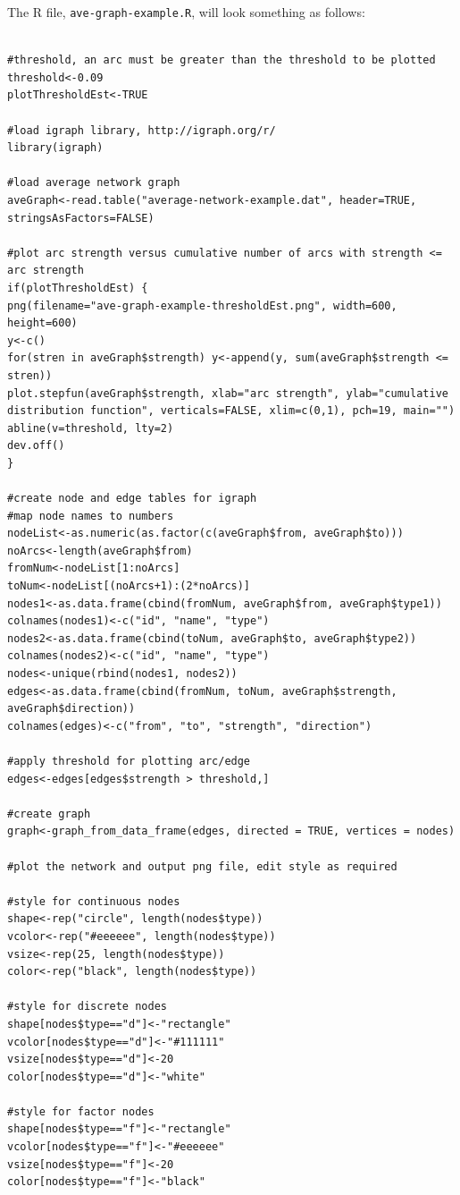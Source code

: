 \documentclass[a4paper,12pt]{article}
\newcommand{\code}[1]{{\footnotesize{{\tt #1}}}}
\begin{document}
The R file, \code{ave-graph-example.R}, will look something as follows: 
\vspace{0.35cm} \begin{lstlisting}

#threshold, an arc must be greater than the threshold to be plotted
threshold<-0.09
plotThresholdEst<-TRUE

#load igraph library, http://igraph.org/r/
library(igraph)

#load average network graph
aveGraph<-read.table("average-network-example.dat", header=TRUE, stringsAsFactors=FALSE)

#plot arc strength versus cumulative number of arcs with strength <= arc strength
if(plotThresholdEst) {
png(filename="ave-graph-example-thresholdEst.png", width=600, height=600)
y<-c()
for(stren in aveGraph$strength) y<-append(y, sum(aveGraph$strength <= stren))
plot.stepfun(aveGraph$strength, xlab="arc strength", ylab="cumulative distribution function", verticals=FALSE, xlim=c(0,1), pch=19, main="")
abline(v=threshold, lty=2)
dev.off()
}

#create node and edge tables for igraph
#map node names to numbers
nodeList<-as.numeric(as.factor(c(aveGraph$from, aveGraph$to)))
noArcs<-length(aveGraph$from)
fromNum<-nodeList[1:noArcs]
toNum<-nodeList[(noArcs+1):(2*noArcs)]
nodes1<-as.data.frame(cbind(fromNum, aveGraph$from, aveGraph$type1))
colnames(nodes1)<-c("id", "name", "type")
nodes2<-as.data.frame(cbind(toNum, aveGraph$to, aveGraph$type2))
colnames(nodes2)<-c("id", "name", "type")
nodes<-unique(rbind(nodes1, nodes2))
edges<-as.data.frame(cbind(fromNum, toNum, aveGraph$strength, aveGraph$direction))
colnames(edges)<-c("from", "to", "strength", "direction")

#apply threshold for plotting arc/edge
edges<-edges[edges$strength > threshold,]

#create graph
graph<-graph_from_data_frame(edges, directed = TRUE, vertices = nodes)

#plot the network and output png file, edit style as required

#style for continuous nodes
shape<-rep("circle", length(nodes$type))
vcolor<-rep("#eeeeee", length(nodes$type))
vsize<-rep(25, length(nodes$type))
color<-rep("black", length(nodes$type))

#style for discrete nodes
shape[nodes$type=="d"]<-"rectangle"
vcolor[nodes$type=="d"]<-"#111111"
vsize[nodes$type=="d"]<-20
color[nodes$type=="d"]<-"white"

#style for factor nodes
shape[nodes$type=="f"]<-"rectangle"
vcolor[nodes$type=="f"]<-"#eeeeee"
vsize[nodes$type=="f"]<-20
color[nodes$type=="f"]<-"black"


\end{lstlisting}
\end{document}
